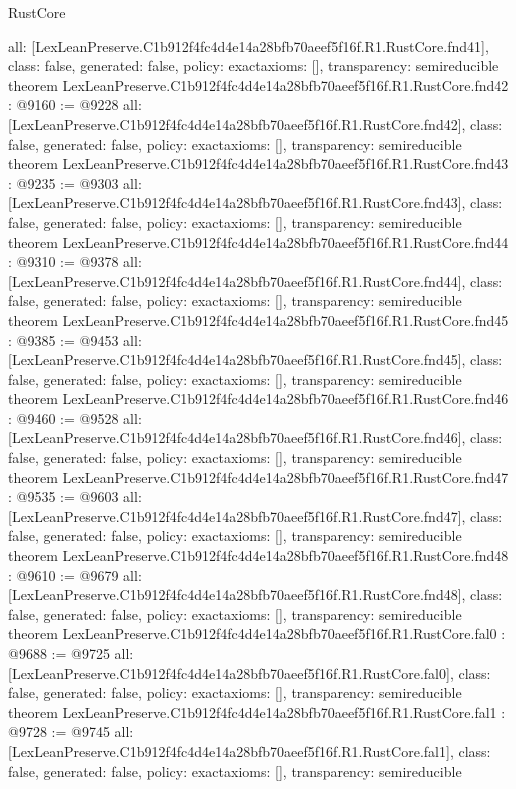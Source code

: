 \begin{lexlean}{RustCore}
\begin{coremodule}
{  all: [LexLeanPreserve.C1b912f4fc4d4e14a28bfb70aeef5f16f.R1.RustCore.fnd41],
  class: false,
  generated: false,
  policy: exact{axioms: []},
  transparency: semireducible
}
theorem LexLeanPreserve.C1b912f4fc4d4e14a28bfb70aeef5f16f.R1.RustCore.fnd42 : @9160 := @9228 {
  all: [LexLeanPreserve.C1b912f4fc4d4e14a28bfb70aeef5f16f.R1.RustCore.fnd42],
  class: false,
  generated: false,
  policy: exact{axioms: []},
  transparency: semireducible
}
theorem LexLeanPreserve.C1b912f4fc4d4e14a28bfb70aeef5f16f.R1.RustCore.fnd43 : @9235 := @9303 {
  all: [LexLeanPreserve.C1b912f4fc4d4e14a28bfb70aeef5f16f.R1.RustCore.fnd43],
  class: false,
  generated: false,
  policy: exact{axioms: []},
  transparency: semireducible
}
theorem LexLeanPreserve.C1b912f4fc4d4e14a28bfb70aeef5f16f.R1.RustCore.fnd44 : @9310 := @9378 {
  all: [LexLeanPreserve.C1b912f4fc4d4e14a28bfb70aeef5f16f.R1.RustCore.fnd44],
  class: false,
  generated: false,
  policy: exact{axioms: []},
  transparency: semireducible
}
theorem LexLeanPreserve.C1b912f4fc4d4e14a28bfb70aeef5f16f.R1.RustCore.fnd45 : @9385 := @9453 {
  all: [LexLeanPreserve.C1b912f4fc4d4e14a28bfb70aeef5f16f.R1.RustCore.fnd45],
  class: false,
  generated: false,
  policy: exact{axioms: []},
  transparency: semireducible
}
theorem LexLeanPreserve.C1b912f4fc4d4e14a28bfb70aeef5f16f.R1.RustCore.fnd46 : @9460 := @9528 {
  all: [LexLeanPreserve.C1b912f4fc4d4e14a28bfb70aeef5f16f.R1.RustCore.fnd46],
  class: false,
  generated: false,
  policy: exact{axioms: []},
  transparency: semireducible
}
theorem LexLeanPreserve.C1b912f4fc4d4e14a28bfb70aeef5f16f.R1.RustCore.fnd47 : @9535 := @9603 {
  all: [LexLeanPreserve.C1b912f4fc4d4e14a28bfb70aeef5f16f.R1.RustCore.fnd47],
  class: false,
  generated: false,
  policy: exact{axioms: []},
  transparency: semireducible
}
theorem LexLeanPreserve.C1b912f4fc4d4e14a28bfb70aeef5f16f.R1.RustCore.fnd48 : @9610 := @9679 {
  all: [LexLeanPreserve.C1b912f4fc4d4e14a28bfb70aeef5f16f.R1.RustCore.fnd48],
  class: false,
  generated: false,
  policy: exact{axioms: []},
  transparency: semireducible
}
theorem LexLeanPreserve.C1b912f4fc4d4e14a28bfb70aeef5f16f.R1.RustCore.fal0 : @9688 := @9725 {
  all: [LexLeanPreserve.C1b912f4fc4d4e14a28bfb70aeef5f16f.R1.RustCore.fal0],
  class: false,
  generated: false,
  policy: exact{axioms: []},
  transparency: semireducible
}
theorem LexLeanPreserve.C1b912f4fc4d4e14a28bfb70aeef5f16f.R1.RustCore.fal1 : @9728 := @9745 {
  all: [LexLeanPreserve.C1b912f4fc4d4e14a28bfb70aeef5f16f.R1.RustCore.fal1],
  class: false,
  generated: false,
  policy: exact{axioms: []},
  transparency: semireducible
}

\end{coremodule}
\end{lexlean}
